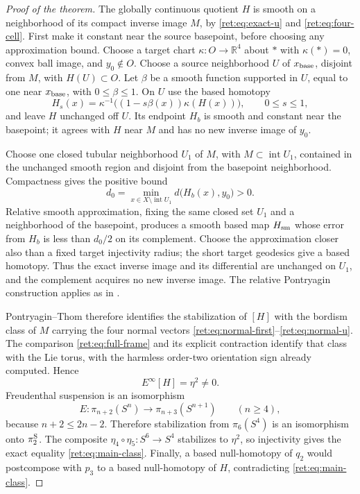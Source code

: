 \documentclass[11pt,letterpaper]{article}
\numberwithin{equation}{section}
\theoremstyle{definition}
\theoremstyle{remark}
\begin{document}
\begin{proof}[Proof of the theorem]
The globally continuous quotient \(H\) is smooth on a neighborhood
of its compact inverse image \(M\), by
\eqref{ret:eq:exact-u} and \eqref{ret:eq:four-cell}. First make it constant
near the source basepoint, before choosing any approximation bound.
Choose a target chart \(\kappa:O\to\mathbb R^4\) about \(*\) with
\(\kappa(*)=0\), convex ball image, and \(y_0\notin O\).
Choose a source neighborhood \(U\) of \(x_{\rm base}\), disjoint
from \(M\), with \(H(U)\subset O\). Let \(\beta\) be a smooth
function supported in \(U\), equal to one near \(x_{\rm base}\),
with \(0\leq\beta\leq1\). On \(U\) use the based homotopy
\[
 H_s(x)=\kappa^{-1}\bigl((1-s\beta(x))\kappa(H(x))\bigr),
 \qquad 0\leq s\leq1,
\]
and leave \(H\) unchanged off \(U\). Its endpoint \(H_b\) is
smooth and constant near the basepoint; it agrees with \(H\)
near \(M\) and has no new inverse image of \(y_0\).

Choose one closed tubular neighborhood \(U_1\) of \(M\), with
\(M\subset\operatorname{int}U_1\), contained in the unchanged
smooth region and disjoint from the basepoint neighborhood.
Compactness gives the positive bound
\[
 d_0=\min_{x\in X\setminus\operatorname{int}U_1}
             d\bigl(H_b(x),y_0\bigr)>0.
\]
Relative smooth approximation, fixing the same closed set \(U_1\)
and a neighborhood of the basepoint, produces a smooth based map
\(H_{\rm sm}\) whose error from \(H_b\) is less than \(d_0/2\)
on its complement. Choose the approximation closer also than a
fixed target injectivity radius; the short target geodesics give a
based homotopy. Thus the exact inverse image and its differential
are unchanged on \(U_1\), and the complement acquires no new
inverse image. The relative Pontryagin construction applies as in
\cite[\S7, Theorem B and Lemma 4, pp.~43, 48--50]{retbib:Milnor1965}.

Pontryagin--Thom therefore identifies the stabilization of
\([H]\) with the bordism class of \(M\) carrying the four normal
vectors \eqref{ret:eq:normal-first}--\eqref{ret:eq:normal-u}.  The comparison
\eqref{ret:eq:full-frame} and its explicit contraction identify that
class with the Lie torus, with the harmless order-two orientation
sign already computed.  Hence
\[
 E^\infty[H]=\eta^2\ne0.
\]
Freudenthal suspension is an isomorphism
\[
 E:\pi_{n+2}(S^n)\longrightarrow\pi_{n+3}(S^{n+1})
 \qquad(n\geq4),
\]
because \(n+2\leq2n-2\).  Therefore stabilization from
\(\pi_6(S^4)\) is an isomorphism onto \(\pi_2^{\rm S}\).
The composite \(\eta_4\circ\eta_5:S^6\to S^4\) stabilizes to
\(\eta^2\), so injectivity gives the exact equality
\eqref{ret:eq:main-class}.  Finally, a based null-homotopy of \(q_2\)
would postcompose with \(p_3\) to a based null-homotopy of \(H\),
contradicting \eqref{ret:eq:main-class}.
\end{proof}
\end{document}
